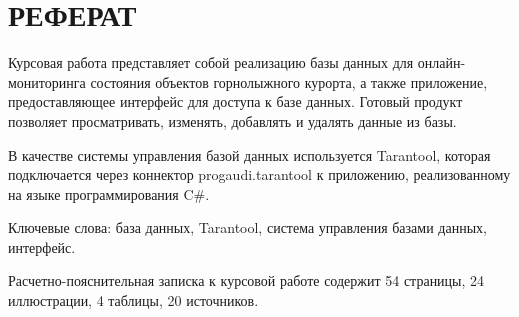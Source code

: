 \chapter*{РЕФЕРАТ}

Курсовая работа представляет собой реализацию базы данных для онлайн-мониторинга состояния объектов горнолыжного курорта, а также приложение, предоставляющее интерфейс для доступа к базе данных. Готовый продукт позволяет просматривать, изменять, добавлять и удалять данные из базы.


В качестве системы управления базой данных используется Tarantool, которая подключается через коннектор progaudi.tarantool к приложению, реализованному на языке программирования C\#.

Ключевые слова: база данных, Tarantool, система управления базами данных, интерфейс.

Расчетно-пояснительная записка к курсовой работе содержит 54 страницы, 24 иллюстрации, 4 таблицы, 20 источников.



